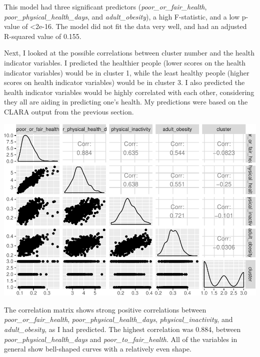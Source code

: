 \documentclass[12pt,twoside]{amherstthesis}
\begin{document}
  This model had three significant predictors
  (\emph{poor\_or\_fair\_health}, \emph{poor\_physical\_health\_days}, and
  \emph{adult\_obesity}), a high F-statistic, and a low p-value of
  \textless{}2e-16. The model did not fit the data very well, and had an
  adjusted R-squared value of 0.155.
  
  Next, I looked at the possible correlations between cluster number and
  the health indicator variables. I predicted the healthier people (lower
  scores on the health indicator variables) would be in cluster 1, while
  the least healthy people (higher scores on health indicator variables)
  would be in cluster 3. I also predicted the health indicator variables
  would be highly correlated with each other, considering they all are
  aiding in predicting one's health. My predictions were based on the
  CLARA output from the previous section.
  
  \begin{Shaded}
  \begin{Highlighting}[]
  \end{Highlighting}
  \end{Shaded}
  
  \begin{center}\includegraphics{Comps_Proj_files/figure-latex/unnamed-chunk-18-1} \end{center}
  
  The correlation matrix shows strong positive correlations between
  \emph{poor\_or\_fair\_health}, \emph{poor\_physical\_health\_days},
  \emph{physical\_inactivity}, and \emph{adult\_obesity}, as I had
  predicted. The highest correlation was 0.884, between
  \emph{poor\_physical\_health\_days} and \emph{poor\_to\_fair\_health}.
  All of the variables in general show bell-shaped curves with a
  relatively even shape.
  
\end{document}
